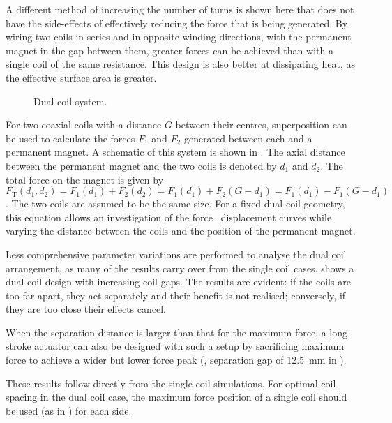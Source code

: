 A different method of increasing the number of turns is shown here
that does not have the side-effects of effectively reducing the force
that is being generated. By wiring two coils in series and in opposite
winding directions, with the permanent magnet in the gap between them,
greater forces can be achieved than with a single coil of the same
resistance. This design is also better at dissipating heat, as the effective
surface area is greater.

\begin{figure}
  \caption{Dual coil system.}
\end{figure}

For two coaxial coils with a distance $G$ between their
centres, superposition can be used to calculate the forces $F_1$ and
$F_2$ generated between each and a permanent magnet. A schematic of this
system is shown in . The axial
distance between the permanent magnet and the two coils is denoted by
$d_1$ and $d_2$. The total force on the magnet is given by
\begin{dmath}
F_{\mathrm{T}}(d_1,d_2)
  =F_1(d_1)+F_2(d_2)
  =F_1(d_1)+F_2(G-d_1)
  =F_1(d_1)-F_1(G-d_1)
\end{dmath}.
The two coils are assumed to be the same size.
For a fixed dual-coil geometry, this equation allows an
investigation of the force \vs\ displacement curves while varying the
distance between the coils and the position of the permanent magnet.

Less comprehensive parameter variations are performed to analyse the dual coil
arrangement, as many of the results carry over from the single coil
cases.  shows a dual-coil design with increasing coil
gaps. The results are evident: if the coils are too far apart, they
act separately and their benefit is not realised; conversely, if they
are too close their effects cancel.

When the separation distance is larger than that for the maximum force, a long stroke actuator can also be designed with such a setup by sacrificing maximum force to achieve a wider but lower force peak (\eg, separation gap of \SI{12.5}{mm} in ).


These results follow directly from the single coil simulations. For
optimal coil spacing in the dual coil case, the maximum force position
of a single coil should be used (as in ) for each
side. 

